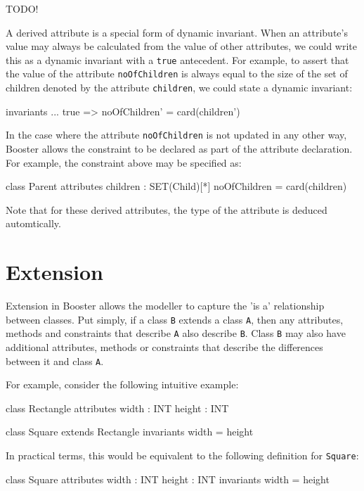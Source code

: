 TODO!

A derived attribute is a special form of dynamic invariant.  When an
attribute's value may always be calculated from the value of other
attributes, we could write this as a dynamic invariant with a
\verb|true| antecedent.  For example, to assert that the value of the
attribute \verb|noOfChildren| is always equal to the size of the set
of children denoted by the attribute \verb|children|, we could state
a dynamic invariant:

\begin{code}
invariants
  ...
  true => noOfChildren' = card(children')
\end{code}

In the case where the attribute \verb|noOfChildren| is not updated in
any other way, Booster allows the constraint to be declared as part of
the attribute declaration.  For example, the constraint above may be
specified as:

\begin{code}
class Parent {
  attributes
    children : SET(Child)[*]
    noOfChildren = card(children)
}
\end{code}

Note that for these derived attributes, the type of the attribute is
deduced automtically.

\section{Extension}

Extension in Booster allows the modeller to capture the 'is a'
relationship between classes.  Put simply, if a class \verb|B| extends
a class \verb|A|, then any attributes, methods and constraints that
describe \verb|A| also describe \verb|B|.  Class \verb|B| may also
have additional attributes, methods or constraints that describe the
differences between it and class \verb|A|.

For example, consider the following intuitive example:

\begin{code}
class Rectangle {
  attributes
    width : INT
    height : INT
}

class Square extends Rectangle {
  invariants
    width = height
}
\end{code}

In practical terms, this would be equivalent to the following
definition for \verb|Square|:

\begin{code}
class Square {
  attributes
    width : INT
    height : INT
  invariants
    width = height
}
\end{code}

